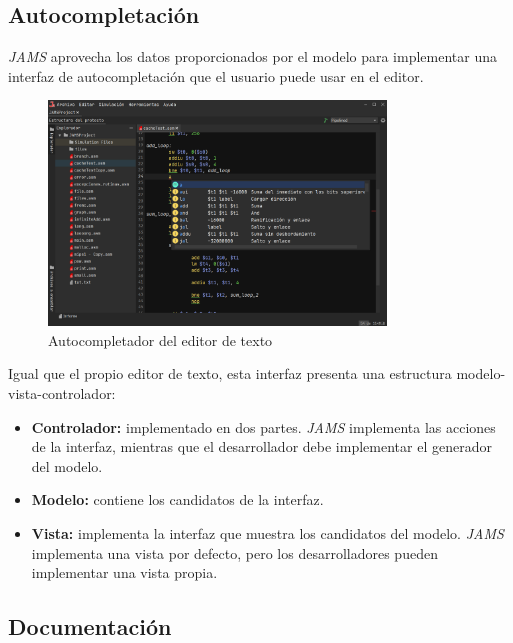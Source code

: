 \subsection{Autocompletación}\label{subsec:autocompletacion}

\textit{JAMS} aprovecha los datos proporcionados por
el modelo para implementar una interfaz de autocompletación
que el usuario puede usar en el editor.

\begin{figure}[H]
    \centering
    \includegraphics[width=0.8\textwidth]{images/base/jams-autocompletion}
    \caption{Autocompletador del editor de texto}
    \label{fig:jams-autocompletador}
\end{figure}

\noindent Igual que el propio editor de texto, esta interfaz
presenta una estructura modelo-vista-controlador:

\begin{itemize}
    \item \textbf{Controlador:} implementado en dos partes.
    \textit{JAMS} implementa las acciones de la interfaz,
    mientras que el desarrollador debe implementar el
    generador del modelo.
    \item \textbf{Modelo:} contiene los candidatos de
    la interfaz.
    \item \textbf{Vista:} implementa la interfaz que
    muestra los candidatos del modelo.
    \textit{JAMS} implementa una vista por defecto,
    pero los desarrolladores pueden implementar una
    vista propia.
\end{itemize}

\subsection{Documentación}\label{subsec:documentacion}


